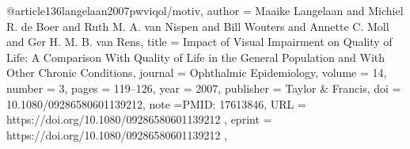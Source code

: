 @article{136langelaan2007pwviqol/motiv,
author = {Maaike Langelaan and Michiel R. de Boer and Ruth M. A. van Nispen and Bill Wouters and Annette C. Moll and Ger H. M. B. van Rens},
title = {Impact of Visual Impairment on Quality of Life: A Comparison With Quality of Life in the General Population and With Other Chronic Conditions},
journal = {Ophthalmic Epidemiology},
volume = {14},
number = {3},
pages = {119--126},
year = {2007},
publisher = {Taylor \& Francis},
doi = {10.1080/09286580601139212},
note ={PMID: 17613846},
URL = { https://doi.org/10.1080/09286580601139212 },
eprint = { https://doi.org/10.1080/09286580601139212 },
}